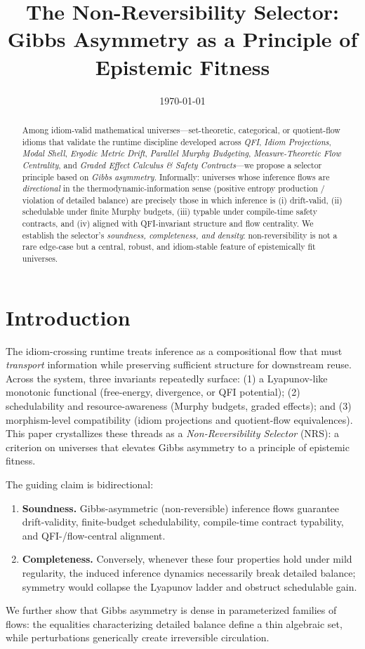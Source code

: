 \documentclass[11pt]{article}
\title{\textbf{The Non-Reversibility Selector:}\\[0.25em] Gibbs Asymmetry as a Principle of Epistemic Fitness}
\author{}
\date{\today}
\theoremstyle{plain}
\theoremstyle{definition}
\theoremstyle{remark}
\newcommand{\1}{\mathds{1}}
\begin{document}
\maketitle

\begin{abstract}
Among idiom-valid mathematical universes---set-theoretic, categorical, or quotient-flow idioms that validate the runtime discipline developed across \emph{QFI}, \emph{Idiom Projections}, \emph{Modal Shell}, \emph{Ergodic Metric Drift}, \emph{Parallel Murphy Budgeting}, \emph{Measure-Theoretic Flow Centrality}, and \emph{Graded Effect Calculus \& Safety Contracts}---we propose a selector principle based on \emph{Gibbs asymmetry}. 
Informally: universes whose inference flows are \emph{directional} in the thermodynamic-information sense (positive entropy production / violation of detailed balance) are precisely those in which inference is (i) drift-valid, (ii) schedulable under finite Murphy budgets, (iii) typable under compile-time safety contracts, and (iv) aligned with QFI-invariant structure and flow centrality.
We establish the selector's \emph{soundness, completeness, and density}: non-reversibility is not a rare edge-case but a central, robust, and idiom-stable feature of epistemically fit universes.
\end{abstract}

\section{Introduction}
The idiom-crossing runtime treats inference as a compositional flow that must \emph{transport} information while preserving sufficient structure for downstream reuse. 
Across the system, three invariants repeatedly surface: (1) a Lyapunov-like monotonic functional (free-energy, divergence, or QFI potential); (2) schedulability and resource-awareness (Murphy budgets, graded effects); and (3) morphism-level compatibility (idiom projections and quotient-flow equivalences).
This paper crystallizes these threads as a \emph{Non-Reversibility Selector} (NRS): a criterion on universes that elevates Gibbs asymmetry to a principle of epistemic fitness.

The guiding claim is bidirectional:
\begin{enumerate}[label=(\roman*)]
\item \textbf{Soundness.} Gibbs-asymmetric (non-reversible) inference flows guarantee drift-validity, finite-budget schedulability, compile-time contract typability, and QFI-/flow-central alignment.
\item \textbf{Completeness.} Conversely, whenever these four properties hold under mild regularity, the induced inference dynamics necessarily break detailed balance; symmetry would collapse the Lyapunov ladder and obstruct schedulable gain.
\end{enumerate}
We further show that Gibbs asymmetry is dense in parameterized families of flows: the equalities characterizing detailed balance define a thin algebraic set, while perturbations generically create irreversible circulation.
\end{document}
